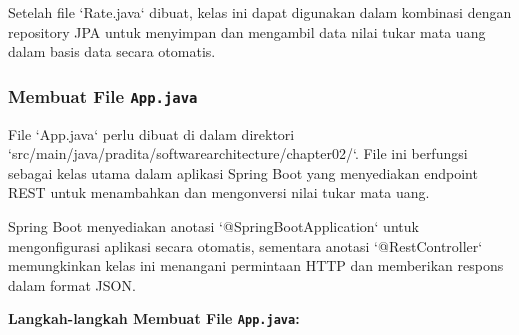 Setelah file `Rate.java` dibuat, kelas ini dapat digunakan dalam kombinasi dengan repository JPA untuk menyimpan dan mengambil data nilai tukar mata uang dalam basis data secara otomatis.

\subsubsection{Membuat File \texttt{App.java}}
File `App.java` perlu dibuat di dalam direktori `src/main/java/pradita/softwarearchitecture/chapter02/`. File ini berfungsi sebagai kelas utama dalam aplikasi Spring Boot yang menyediakan endpoint REST untuk menambahkan dan mengonversi nilai tukar mata uang.

Spring Boot menyediakan anotasi `@SpringBootApplication` untuk mengonfigurasi aplikasi secara otomatis, sementara anotasi `@RestController` memungkinkan kelas ini menangani permintaan HTTP dan memberikan respons dalam format JSON.

\textbf{Langkah-langkah Membuat File \texttt{App.java}:}

